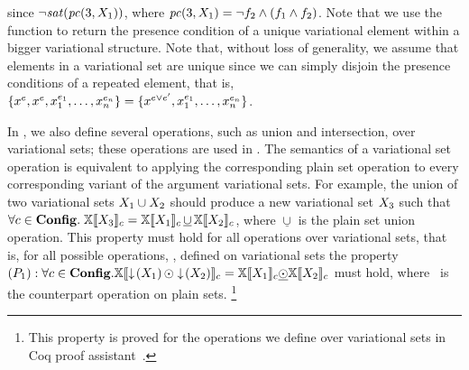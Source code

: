 since 
\ensuremath{\neg \sat {\getPCfrom 3 {\vset_1} }},
where
\ensuremath{
{\getPCfrom 3 {\vset_1} } = \neg \B \wedge (\A \wedge \B)}.
Note that we use the function \getPCfrom \elem {\annot \vset} to 
return the presence condition of a unique variational element within a bigger
variational structure. 
Note that,
without loss of generality, we assume that elements in a variational set
are unique since we can simply disjoin the presence conditions of a repeated 
element, that is, 
\ensuremath{\setDef {\annot [\dimMeta] \elem, \annot [\dimMeta] \elem, \annot [\dimMeta_1] \elem_1, \ldots, \annot [\dimMeta_n] \elem_n} = \setDef {\annot [\dimMeta \vee \VVal \dimMeta] \elem, \annot [\dimMeta_1] \elem_1, \ldots, \annot [\dimMeta_n] \elem_n}}.

In , we also define several operations, such as union and
intersection, over variational sets; these operations are used in . The
semantics of a variational set operation is equivalent to applying the corresponding
plain set operation to every corresponding variant of the argument variational sets. For
example, the union of two variational sets $\vset_1\cup\vset_2$ should produce a new
variational set $\vset_3$ such that
%
$\forall c\in\confSet.\;
\osetSem{\vset_3} = \osetSem{\vset_1}\,\underline{\cup}\,\osetSem{\vset_2}$,
where $\underline{\cup}$ is the plain set union operation.
%
 This property must hold for all operations over variational sets, that is, for all possible operations, \vsetOp, defined on variational sets the property 
 \ensuremath{
 \Pone: 
 \forall \config \in \confSet. \osetSem {\pushIn {\vset_1} \vsetOp \pushIn {\vset_2}} 
 = \osetSem {\vset_1} \psetOp \osetSem {\vset_2}
 } must hold, where \psetOp\ is the counterpart operation on plain sets.%
\footnote{This property is proved for the operations we define over variational sets in Coq proof assistant~\cite{Khan21}.}

